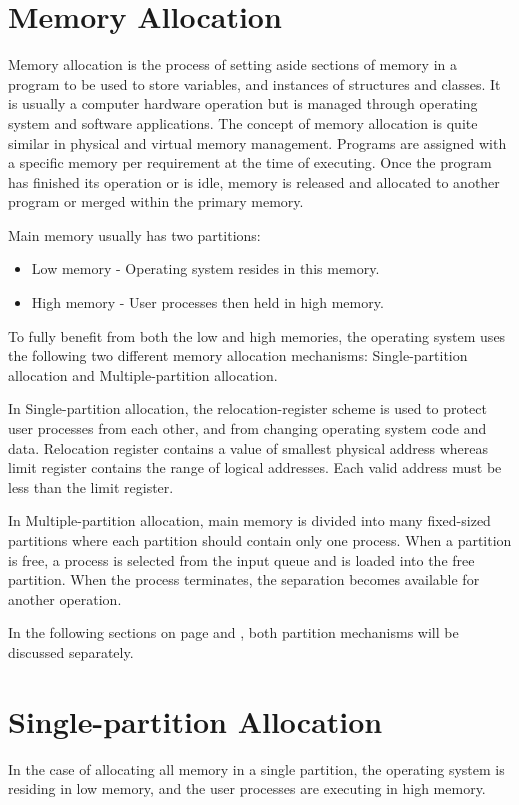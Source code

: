 \documentclass[doc,natbib,12pt]{apa6}
\begin{document}
	\newpage
	\section{Memory Allocation} \label{chp:memoryAllocation}
	Memory allocation is the process of setting aside sections of memory in a program to be used to store variables, and instances of structures and classes. It is usually a computer hardware operation but is managed through operating system and software applications. The concept of memory allocation is quite similar in physical and virtual memory management. Programs are assigned with a specific memory per requirement at the time of executing. Once the program has finished its operation or is idle, memory is released and allocated to another program or merged within the primary memory.
	
	Main memory usually has two partitions:
	\begin{itemize}
		\item Low memory - Operating system resides in this memory.
		\item High memory - User processes then held in high memory.
	\end{itemize}
	
	To fully benefit from both the low and high memories, the operating system uses the following two different memory allocation mechanisms: Single-partition allocation and Multiple-partition allocation.
	
	In Single-partition allocation, the relocation-register scheme is used to protect user processes from each other, and from changing operating system code and data. Relocation register contains a value of smallest physical address whereas limit register contains the range of logical addresses. Each valid address must be less than the limit register.
	
	In Multiple-partition allocation, main memory is divided into many fixed-sized partitions where each partition should contain only one process. 
	When a partition is free, a process is selected from the input queue and is loaded into the free partition. When the process terminates, the separation becomes available for another operation.
	
	In the following sections on page \pageref{chp:singlePartitionAllocation} and \pageref{chp:MultiplePartitionAllocation}, both partition mechanisms will be discussed separately.
	
	\newpage
	\section{Single-partition Allocation} \label{chp:singlePartitionAllocation}
	In the case of allocating all memory in a single partition, the operating system is residing in low memory, and the user processes are executing in high memory. 
	
\end{document}
